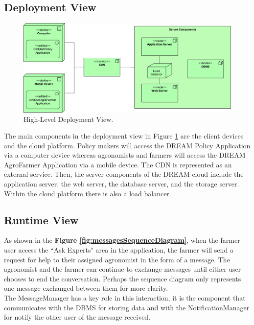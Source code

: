 \subsection{Deployment View}
\begin{figure}[hbt!]
\centering
\includegraphics[width=\textwidth]{../images_diagrams/dd/highlevel_deployment.png}
\caption{High-Level Deployment View.}
\label{fig:highLevelDeploy}
\end{figure}

\begin{flushleft}
The main components in the deployment view in Figure \ref{fig:highLevelDeploy} are the client devices and the cloud platform. Policy makers will access the DREAM Policy Application via a computer device whereas agronomists and farmers will access the DREAM AgroFarmer Application via a mobile device. The CDN is represented as an external service. Then, the server components of the DREAM cloud include the application server, the web server, the database server, and the storage server. Within the cloud platform there is also a load balancer.
\end{flushleft}


\subsection{Runtime View}


\begin{flushleft}
As shown in the \textbf{Figure \ref{fig:messagesSequenceDiagram}}, when the farmer user access the “Ask Experts" area in the application, the farmer will send a request for help to their assigned agronomist in the form of a message. The agronomist and the farmer can continue to exchange messages until either user chooses to end the conversation. Perhaps the sequence diagram only represents one message exchanged between them for more clarity.\\
The MessageManager has a key role in this interaction, it is the component that communicates with the DBMS for storing data and with the NotificationManager for notify the other user of the message received.

\end{flushleft}

